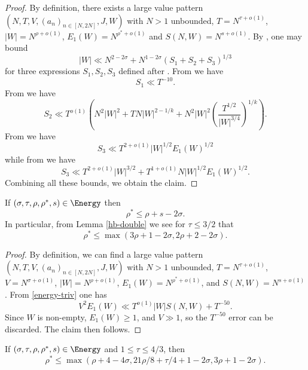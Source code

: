 \literature
{}

\begin{proof} By definition, there exists a large value pattern $(N,T,V,(a_n)_{n \in [N,2N]},J,W)$ with $N>1$ unbounded, $T = N^{\tau+o(1)}$, $|W| = N^{\rho+o(1)}$, $E_1(W) = N^{\rho^*+o(1)}$ and $S(N,W) = N^{s+o(1)}$.  By \cite[Proposition 4.6, (5.5)]{guth-maynard}, one may bound
$$ |W| \ll N^{2-2\sigma} + N^{1-2\sigma} (S_1 + S_2 + S_3)^{1/3}$$
for three expressions $S_1, S_2, S_3$ defined after \cite[(5.5)]{guth-maynard}.  From \cite[Proposition 5.1]{guth-maynard} we have
$$ S_1 \ll T^{-10}.$$
From \cite[Proposition 6.1]{guth-maynard} we have
$$ S_2 \ll T^{o(1)} ( N^2 |W|^2 + T N |W|^{2-1/k} + N^2 |W|^2 (\frac{T^{1/2}}{|W|^{3/4}})^{1/k} ).$$
From \cite[Proposition 8.1]{guth-maynard} we have
$$ S_3 \ll T^{2+o(1)} |W|^{1/2} E_1(W)^{1/2}$$
while from \cite[Proposition 10.1]{guth-maynard} we have
$$ S_3 \ll T^{2+o(1)} |W|^{3/2} + T^{1+o(1)} N |W|^{1/2} E_1(W)^{1/2}.$$
Combining all these bounds, we obtain the claim.
\end{proof}

\begin{lemma}\cite[Lemma 1.7]{guth-maynard}  If $(\sigma,\tau,\rho,\rho^*,s) \in \Energy$ then
$$ \rho^* \leq \rho + s - 2\sigma.$$
In particular, from Lemma \ref{hb-double} we see for $\tau \leq 3/2$ that
$$ \rho^* \leq \max(3\rho+1-2\sigma, 2\rho+2-2\sigma).$$
\end{lemma}

\literature
{}

\begin{proof} By definition, we can find a large value pattern $(N,T,V,(a_n)_{n \in [N,2N]},J,W)$ with $N>1$ unbounded, $T = N^{\tau+o(1)}$, $V = N^{\sigma+o(1)}$, $|W| = N^{\rho+o(1)}$, $E_1(W) = N^{\rho^*+o(1)}$, and $S(N,W) = N^{s+o(1)}$. From \eqref{energy-triv} one has
$$    V^2 E_1(W) \ll T^{o(1)} |W| S(N,W) + T^{-50}.$$
Since $W$ is non-empty, $E_1(W) \geq 1$, and $V \gg 1$, so the $T^{-50}$ error can be discarded.  The claim then follows.
\end{proof}


\begin{lemma}\label{gm-3}  If $(\sigma,\tau,\rho,\rho^*, s) \in \Energy$ and $1 \leq \tau \leq 4/3$, then
    $$ \rho^* \leq \max(\rho+4-4\sigma, 21\rho/8+\tau/4+1-2\sigma, 3\rho+1-2\sigma).$$
\end{lemma}

